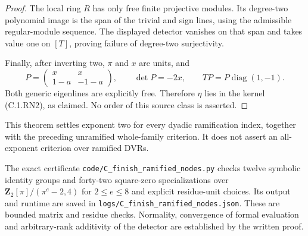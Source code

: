 \begin{proof}
The local ring $R$ has only free finite projective modules.
Its degree-two polynomial image is the span of the trivial
and sign lines, using the admissible regular-module sequence.
The displayed detector vanishes on that span and takes value
one on $[T]$, proving failure of degree-two surjectivity.

Finally, after inverting two, $\pi$ and $x$ are units, and
\[
 P=\begin{pmatrix}x&x\\1-a&-1-a\end{pmatrix},
 \qquad \det P=-2x,\qquad
 TP=P\operatorname{diag}(1,-1).
\]
Both generic eigenlines are explicitly free. Therefore
$\eta$ lies in the kernel (C.1.RN2), as claimed.
No order of this source class is asserted.
\end{proof}

This theorem settles exponent two for every dyadic ramification
index, together with the preceding unramified whole-family
criterion. It does not assert an all-exponent criterion over
ramified DVRs.

The exact certificate \texttt{code/C\_finish\_ramified\_nodes.py}
checks twelve symbolic identity groups and forty-two square-zero
specializations over
$\mathbf Z_2[\pi]/(\pi^e-2,4)$ for $2\le e\le8$ and explicit
residue-unit choices. Its output and runtime are saved in
\texttt{logs/C\_finish\_ramified\_nodes.json}.
These are bounded matrix and residue checks. Normality, convergence
of formal evaluation and arbitrary-rank additivity of the detector
are established by the written proof.

